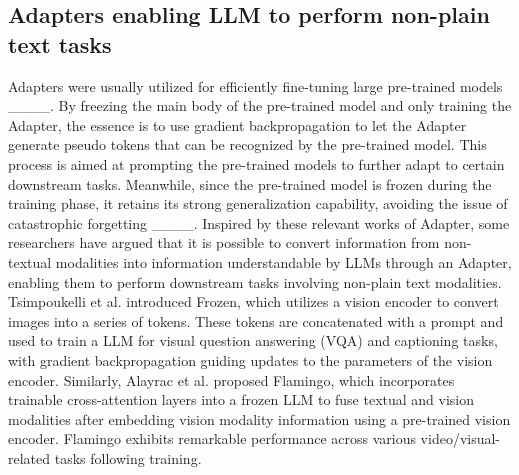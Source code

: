 	
	\subsection{Adapters enabling LLM to perform non-plain text tasks}
	Adapters were usually utilized for efficiently fine-tuning large pre-trained models ____. By freezing the main body of the pre-trained model and only training the Adapter, the essence is to use gradient backpropagation to let the Adapter generate pseudo tokens that can be recognized by the pre-trained model. This process is aimed at prompting the pre-trained models to further adapt to certain downstream tasks. Meanwhile, since the pre-trained model is frozen during the training phase, it retains its strong generalization capability, avoiding the issue of catastrophic forgetting ____. Inspired by these relevant works of Adapter, some researchers have argued that it is possible to convert information from non-textual modalities into information understandable by LLMs through an Adapter, enabling them to perform downstream tasks involving non-plain text modalities.
	Tsimpoukelli et al.  introduced Frozen, which utilizes a vision encoder to convert images into a series of tokens. These tokens are concatenated with a prompt and used to train a LLM for visual question answering (VQA) and captioning tasks, with gradient backpropagation guiding updates to the parameters of the vision encoder.
	Similarly, Alayrac et al.  proposed Flamingo, which incorporates trainable cross-attention layers into a frozen LLM to fuse textual and vision modalities after embedding vision modality information using a pre-trained vision encoder. Flamingo exhibits remarkable performance across various video/visual-related tasks following training. 
